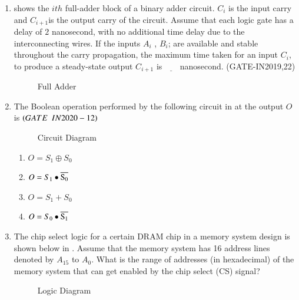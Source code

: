 \begin{enumerate}[label=\arabic*.,ref=\theenumi]
\item 
	shows the $ith$ full-adder block of a binary adder circuit. $C_i$ is the input carry and $C_{i+1}$is the output carry of the circuit. Assume that each logic gate has a delay of $2$ nanosecond, with no additional time delay due to the interconnecting wires. If the inputs $A_i$ , $B_i$; are available and stable throughout the carry propagation, the maximum time taken for an input $C_i$, to produce a steady-state output $C_{i+1}$ is $\underline{\hspace{18pt}}$ nanosecond.
	               \hfill(GATE-IN2019,22)
\begin{figure}[H] 
    \centering
    \resizebox{0.75\columnwidth}{!}{%
	
	}
	\caption{Full Adder}
	\label{fig:GATE-IN2019,22}
\end{figure}
\item The Boolean operation performed by the following  circuit 
in
	at the output $O$ is \underline{\hspace{2cm}}
    $\hfill\brak{GATE \enspace IN2020-12}$

\begin{figure}[H]
	\centering
	\resizebox{0.75\columnwidth}{!}{%

	}
\caption{Circuit Diagram}
\label{fig:figure13}
\end{figure}

\begin{enumerate}

            \item  $O=S_1\oplus S_0$ 
            
            \item  $O=S_1\bullet\overline{\rm S_0}$
            
            \item  $O=S_1 + S_0$
            
            \item $O=S_0\bullet\overline{\rm S _1}$
 \end{enumerate}
\item  The chip select logic for a certain DRAM chip in a memory system design is shown below
	in
.
	Assume that the memory system has 16 address lines denoted by ${A_{15}}$ to ${A_0}$. What is the range of addresses (in hexadecimal) of the memory system that can get enabled by the chip select (CS) signal?
\hfill{}

\begin{figure}[H]

\caption{Logic Diagram}
\label{fig:figure14}
\end{figure}


\end{enumerate}
